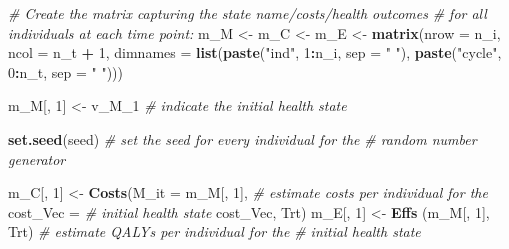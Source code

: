 \documentclass[
]{article}
\newenvironment{Shaded}{\begin{snugshade}}{\end{snugshade}}
\newcommand{\AttributeTok}[1]{\textcolor[rgb]{0.13,0.29,0.53}{#1}}
\newcommand{\CommentTok}[1]{\textcolor[rgb]{0.56,0.35,0.01}{\textit{#1}}}
\newcommand{\DecValTok}[1]{\textcolor[rgb]{0.00,0.00,0.81}{#1}}
\newcommand{\FunctionTok}[1]{\textcolor[rgb]{0.13,0.29,0.53}{\textbf{#1}}}
\newcommand{\NormalTok}[1]{#1}
\newcommand{\OtherTok}[1]{\textcolor[rgb]{0.56,0.35,0.01}{#1}}
\newcommand{\SpecialCharTok}[1]{\textcolor[rgb]{0.81,0.36,0.00}{\textbf{#1}}}
\newcommand{\StringTok}[1]{\textcolor[rgb]{0.31,0.60,0.02}{#1}}
\begin{document}
\begin{Shaded}
\begin{Highlighting}[]
  \CommentTok{\# Create the matrix capturing the state name/costs/health outcomes }
  \CommentTok{\# for all individuals at each time point:}
\NormalTok{  m\_M }\OtherTok{\textless{}{-}}\NormalTok{ m\_C }\OtherTok{\textless{}{-}}\NormalTok{ m\_E }\OtherTok{\textless{}{-}}  \FunctionTok{matrix}\NormalTok{(}\AttributeTok{nrow =}\NormalTok{ n\_i, }\AttributeTok{ncol =}\NormalTok{ n\_t }\SpecialCharTok{+} \DecValTok{1}\NormalTok{, }
                               \AttributeTok{dimnames =} \FunctionTok{list}\NormalTok{(}\FunctionTok{paste}\NormalTok{(}\StringTok{"ind"}\NormalTok{, }\DecValTok{1}\SpecialCharTok{:}\NormalTok{n\_i, }\AttributeTok{sep =} \StringTok{" "}\NormalTok{), }
                                               \FunctionTok{paste}\NormalTok{(}\StringTok{"cycle"}\NormalTok{, }\DecValTok{0}\SpecialCharTok{:}\NormalTok{n\_t, }\AttributeTok{sep =} \StringTok{" "}\NormalTok{)))  }
  
\NormalTok{  m\_M[, }\DecValTok{1}\NormalTok{] }\OtherTok{\textless{}{-}}\NormalTok{ v\_M\_1                  }\CommentTok{\# indicate the initial health state   }
  
  \FunctionTok{set.seed}\NormalTok{(seed)                     }\CommentTok{\# set the seed for every individual for the}
                                     \CommentTok{\# random number generator}
  
\NormalTok{  m\_C[, }\DecValTok{1}\NormalTok{] }\OtherTok{\textless{}{-}} \FunctionTok{Costs}\NormalTok{(}\AttributeTok{M\_it =}\NormalTok{ m\_M[, }\DecValTok{1}\NormalTok{], }\CommentTok{\# estimate costs per individual for the }
                    \AttributeTok{cost\_Vec =}       \CommentTok{\# initial health state}
\NormalTok{                      cost\_Vec,}
\NormalTok{                    Trt)             }
\NormalTok{  m\_E[, }\DecValTok{1}\NormalTok{] }\OtherTok{\textless{}{-}} \FunctionTok{Effs}\NormalTok{ (m\_M[, }\DecValTok{1}\NormalTok{], Trt)   }\CommentTok{\# estimate QALYs per individual for the }
                                     \CommentTok{\# initial health state  }
  

\end{Highlighting}
\end{Shaded}
\end{document}
